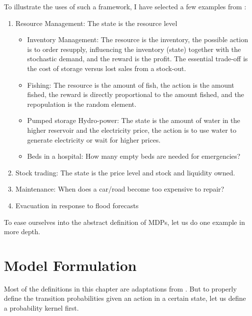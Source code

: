To illustrate the uses of such a framework, I have selected a few examples from \textcite{whiteRealApplicationsMarkov1985}:
\begin{enumerate}
	\item Resource Management: The state is the resource level
	\begin{itemize}
		\item Inventory Management: The resource is the inventory, the possible action is to order resupply, influencing the inventory (state) together with the stochastic demand, and the reward is the profit. The essential trade-off is the cost of storage versus lost sales from a stock-out.
		\item Fishing: The resource is the amount of fish, the action is the amount fished, the reward is directly proportional to the amount fished, and the repopulation is the random element.
		\item Pumped storage Hydro-power: The state is the amount of water in the higher reservoir and the electricity price, the action is to use water to generate electricity or wait for higher prices.
		\item Beds in a hospital: How many empty beds are needed for emergencies?
	\end{itemize}
	\item Stock trading: The state is the price level and stock and liquidity owned.
	\item Maintenance: When does a car/road become too expensive to repair?
	\item Evacuation in response to flood forecasts
\end{enumerate}
To ease ourselves into the abstract definition of MDPs, let us do one example in more depth.
\begin{example}
	
\end{example}

\section{Model Formulation}
Most of the definitions in this chapter are adaptations from \textcite{szepesvariAlgorithmsReinforcementLearning2010}.
But to properly define the transition probabilities given an action in a certain state, let us define a probability kernel first.

